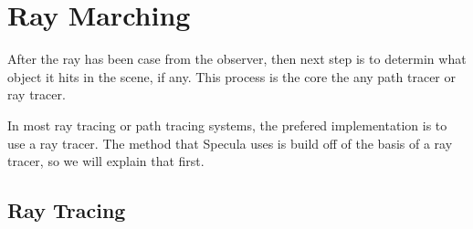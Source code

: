 \documentclass[../pbr.tex]{subfile}
\begin{document}
\section{Ray Marching}%
\label{sec:ray_marching}

After the ray has been case from the observer, then next step is to determin
what object it hits in the scene, if any. This process is the core the any path
tracer or ray tracer.

In most ray tracing or path tracing systems, the prefered implementation is to
use a ray tracer. The method that Specula uses is build off of the basis of a
ray tracer, so we will explain that first.

\subsection{Ray Tracing}%
\label{sub:ray_tracing}
\end{document}
